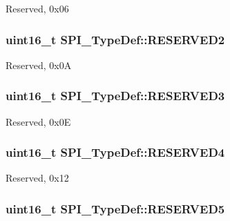 Reserved, 0x06 \hypertarget{struct_s_p_i___type_def_a09ce56649bb5477e2fcf3e92bca8f735}{
\subsubsection[{R\-E\-S\-E\-R\-V\-E\-D2}]{\setlength{\rightskip}{0pt plus 5cm}uint16\-\_\-t S\-P\-I\-\_\-\-Type\-Def\-::\-R\-E\-S\-E\-R\-V\-E\-D2}}\label{struct_s_p_i___type_def_a09ce56649bb5477e2fcf3e92bca8f735}
Reserved, 0x0\-A \hypertarget{struct_s_p_i___type_def_aeb1d1d561f1d51232369197fa7acb53a}{
\subsubsection[{R\-E\-S\-E\-R\-V\-E\-D3}]{\setlength{\rightskip}{0pt plus 5cm}uint16\-\_\-t S\-P\-I\-\_\-\-Type\-Def\-::\-R\-E\-S\-E\-R\-V\-E\-D3}}\label{struct_s_p_i___type_def_aeb1d1d561f1d51232369197fa7acb53a}
Reserved, 0x0\-E \hypertarget{struct_s_p_i___type_def_a20e3ac1445ed1e7a9792ca492c46a73a}{
\subsubsection[{R\-E\-S\-E\-R\-V\-E\-D4}]{\setlength{\rightskip}{0pt plus 5cm}uint16\-\_\-t S\-P\-I\-\_\-\-Type\-Def\-::\-R\-E\-S\-E\-R\-V\-E\-D4}}\label{struct_s_p_i___type_def_a20e3ac1445ed1e7a9792ca492c46a73a}
Reserved, 0x12 \hypertarget{struct_s_p_i___type_def_ab63440e38c7872a8ed11fb2d8d94714e}{
\subsubsection[{R\-E\-S\-E\-R\-V\-E\-D5}]{\setlength{\rightskip}{0pt plus 5cm}uint16\-\_\-t S\-P\-I\-\_\-\-Type\-Def\-::\-R\-E\-S\-E\-R\-V\-E\-D5}}\label{struct_s_p_i___type_def_ab63440e38c7872a8ed11fb2d8d94714e}
